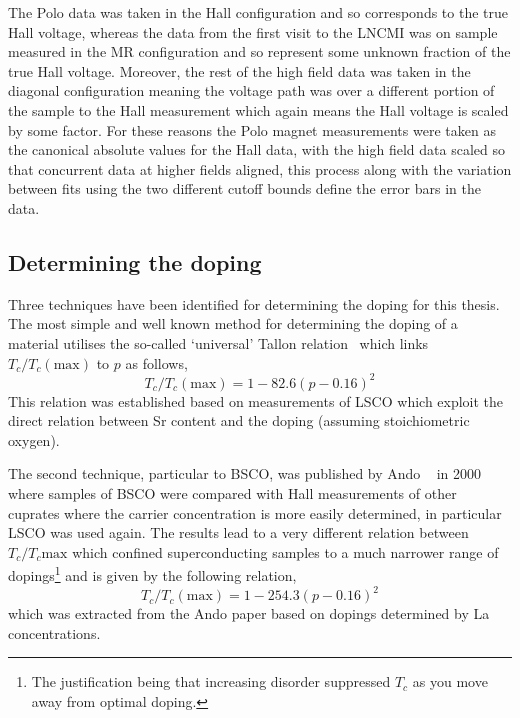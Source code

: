 The Polo data was taken in the Hall configuration and so corresponds to the true Hall voltage, whereas the data from the first visit to the \ac{LNCMI} was on sample measured in the \ac{MR} configuration and so represent some unknown fraction of the true Hall voltage. Moreover, the rest of the high field data was taken in the diagonal configuration meaning the voltage path was over a different portion of the sample to the Hall measurement which again means the Hall voltage is scaled by some factor. For these reasons the Polo magnet measurements were taken as the canonical absolute values for the Hall data, with the high field data scaled so that concurrent data at higher fields aligned, this process along with the variation between fits using the two different cutoff bounds define the error bars in the data.


\subsection{Determining the doping}

Three techniques have been identified for determining the doping for this thesis. The most simple and well known method for determining the doping of a material utilises the so-called `universal' Tallon relation~\cite{Presland1991} which links $T_c/T_c(\textrm{max})$ to $p$ as follows,
\begin{equation}
\label{Eqn:ExpH:TallonRelation}
T_c/T_c(\textrm{max}) = 1 - 82.6 (p - 0.16)^2
\end{equation}
This relation was established based on measurements of \acf{LSCO} which exploit the direct relation between Sr content and the doping (assuming stoichiometric oxygen).

The second technique, particular to \ac{BSCO}, was published by Ando \etal~\cite{Ando2000} in 2000 where samples of \ac{BSCO} were compared with Hall measurements of other cuprates where the carrier concentration is more easily determined, in particular \ac{LSCO} was used again. The results lead to a very different relation between $T_c/T_c{\textrm{max}}$ which confined superconducting samples to a much narrower range of dopings\footnote{The justification being that increasing disorder suppressed $T_c$ as you move away from optimal doping.} and is given by the following relation,
\begin{equation}
\label{Eqn:Exp:AndoRelation}
T_c/T_c(\textrm{max}) = 1 - 254.3 (p - 0.16)^2
\end{equation}
which was extracted from the Ando paper based on dopings determined by La concentrations. 

